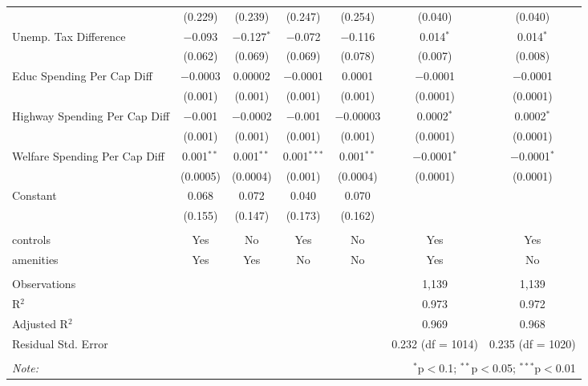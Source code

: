 \begin{table}[!htbp]
\begin{tabular}{@{\extracolsep{5pt}}lcccccc}
  & (0.229) & (0.239) & (0.247) & (0.254) & (0.040) & (0.040) \\ 
  Unemp. Tax Difference & $-$0.093 & $-$0.127$^{*}$ & $-$0.072 & $-$0.116 & 0.014$^{*}$ & 0.014$^{*}$ \\ 
  & (0.062) & (0.069) & (0.069) & (0.078) & (0.007) & (0.008) \\ 
  Educ Spending Per Cap Diff & $-$0.0003 & 0.00002 & $-$0.0001 & 0.0001 & $-$0.0001 & $-$0.0001 \\ 
  & (0.001) & (0.001) & (0.001) & (0.001) & (0.0001) & (0.0001) \\ 
  Highway Spending Per Cap Diff & $-$0.001 & $-$0.0002 & $-$0.001 & $-$0.00003 & 0.0002$^{*}$ & 0.0002$^{*}$ \\ 
  & (0.001) & (0.001) & (0.001) & (0.001) & (0.0001) & (0.0001) \\ 
  Welfare Spending Per Cap Diff & 0.001$^{**}$ & 0.001$^{**}$ & 0.001$^{***}$ & 0.001$^{**}$ & $-$0.0001$^{*}$ & $-$0.0001$^{*}$ \\ 
  & (0.0005) & (0.0004) & (0.001) & (0.0004) & (0.0001) & (0.0001) \\ 
  Constant & 0.068 & 0.072 & 0.040 & 0.070 &  &  \\ 
  & (0.155) & (0.147) & (0.173) & (0.162) &  &  \\ 
 \hline \\[-1.8ex] 
controls & Yes & No & Yes & No & Yes & Yes \\ 
amenities & Yes & Yes & No & No & Yes & No \\ 
\hline \\[-1.8ex] 
Observations &  &  &  &  & 1,139 & 1,139 \\ 
R$^{2}$ &  &  &  &  & 0.973 & 0.972 \\ 
Adjusted R$^{2}$ &  &  &  &  & 0.969 & 0.968 \\ 
Residual Std. Error &  &  &  &  & 0.232 (df = 1014) & 0.235 (df = 1020) \\ 
\hline 
\hline \\[-1.8ex] 
\textit{Note:}  & \multicolumn{6}{r}{$^{*}$p$<$0.1; $^{**}$p$<$0.05; $^{***}$p$<$0.01} \\ 
\end{tabular} 
\end{table} 
